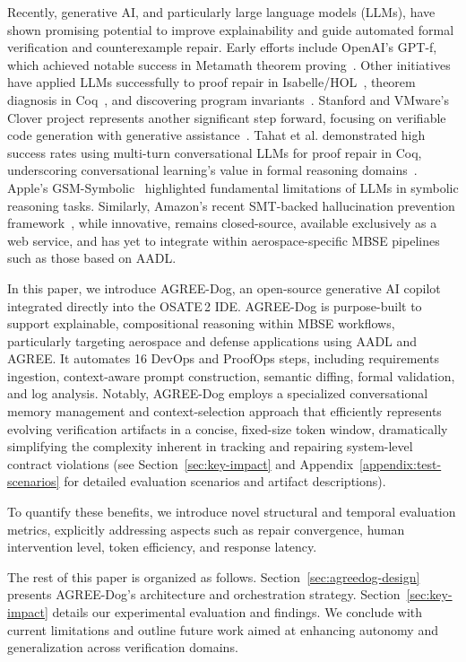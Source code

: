 Recently, generative AI, and particularly large language models (LLMs), have shown promising potential to improve explainability and guide automated formal verification and counterexample repair. Early efforts include OpenAI’s GPT-f, which achieved notable success in Metamath theorem proving~\cite{polu2020generative, megill2019metamath}. Other initiatives have applied LLMs successfully to proof repair in Isabelle/HOL~\cite{first2023baldur}, theorem diagnosis in Coq~\cite{zhang2023getting}, and discovering program invariants~\cite{pei2023can, wu2023lemur}. Stanford and VMware’s Clover project represents another significant step forward, focusing on verifiable code generation with generative assistance~\cite{sun2024clover}. Tahat et al. demonstrated high success rates using multi-turn conversational LLMs for proof repair in Coq, underscoring conversational learning’s value in formal reasoning domains~\cite{CoqDog, CoqDogHCSS24}.
%
Apple's GSM-Symbolic~\cite{mirzadeh2025gsmsymbolic} highlighted fundamental limitations of LLMs in symbolic reasoning tasks. Similarly, Amazon’s recent SMT-backed hallucination prevention framework~\cite{amazon2024mathematical}, while innovative, remains closed-source, available exclusively as a web service, and has yet to integrate within aerospace-specific MBSE pipelines such as those based on AADL.

In this paper, we introduce AGREE-Dog, an open-source generative AI copilot integrated directly into the OSATE\,2 IDE. AGREE-Dog is purpose-built to support explainable, compositional reasoning within MBSE workflows, particularly targeting aerospace and defense applications using AADL and AGREE. It automates 16 DevOps and ProofOps steps, including requirements ingestion, context-aware prompt construction, semantic diffing, formal validation, and log analysis. Notably, AGREE-Dog employs a specialized conversational memory management and context-selection approach that efficiently represents evolving verification artifacts in a concise, fixed-size token window, dramatically simplifying the complexity inherent in tracking and repairing system-level contract violations (see Section~\ref{sec:key-impact} and Appendix~\ref{appendix:test-scenarios} for detailed evaluation scenarios and artifact descriptions).

To quantify these benefits, we introduce novel structural and temporal evaluation metrics, explicitly addressing aspects such as repair convergence, human intervention level, token efficiency, and response latency.

The rest of this paper is organized as follows. 
Section~\ref{sec:agreedog-design} presents AGREE-Dog’s architecture and orchestration strategy. Section~\ref{sec:key-impact} details our experimental evaluation and findings. We conclude with current limitations and outline future work aimed at enhancing autonomy and generalization across verification domains.


